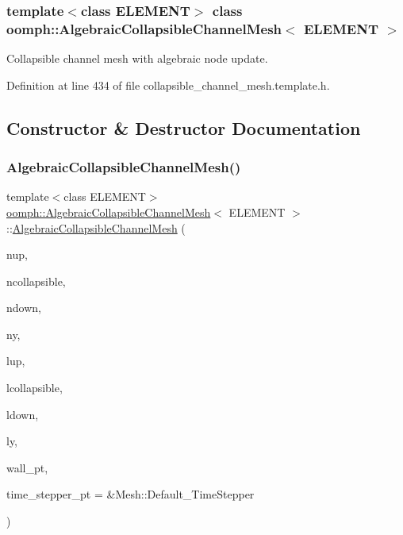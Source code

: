 \subsubsection*{template$<$class E\+L\+E\+M\+E\+NT$>$\newline
class oomph\+::\+Algebraic\+Collapsible\+Channel\+Mesh$<$ E\+L\+E\+M\+E\+N\+T $>$}

Collapsible channel mesh with algebraic node update. 

Definition at line 434 of file collapsible\+\_\+channel\+\_\+mesh.\+template.\+h.



\subsection{Constructor \& Destructor Documentation}
\mbox{\label{classoomph_1_1AlgebraicCollapsibleChannelMesh_ac2e77539dfed482cc3d8b7c9e17a9567}} 
\subsubsection{\texorpdfstring{Algebraic\+Collapsible\+Channel\+Mesh()}{AlgebraicCollapsibleChannelMesh()}\hspace{0.1cm}{\footnotesize\ttfamily [1/2]}}
{\footnotesize\ttfamily template$<$class E\+L\+E\+M\+E\+NT$>$ \\
\hyperlink{classoomph_1_1AlgebraicCollapsibleChannelMesh}{oomph\+::\+Algebraic\+Collapsible\+Channel\+Mesh}$<$ E\+L\+E\+M\+E\+NT $>$\+::\hyperlink{classoomph_1_1AlgebraicCollapsibleChannelMesh}{Algebraic\+Collapsible\+Channel\+Mesh} (\begin{DoxyParamCaption}\item[{const unsigned \&}]{nup,  }\item[{const unsigned \&}]{ncollapsible,  }\item[{const unsigned \&}]{ndown,  }\item[{const unsigned \&}]{ny,  }\item[{const double \&}]{lup,  }\item[{const double \&}]{lcollapsible,  }\item[{const double \&}]{ldown,  }\item[{const double \&}]{ly,  }\item[{Geom\+Object $\ast$}]{wall\+\_\+pt,  }\item[{Time\+Stepper $\ast$}]{time\+\_\+stepper\+\_\+pt = {\ttfamily \&Mesh\+:\+:Default\+\_\+TimeStepper} }\end{DoxyParamCaption})\hspace{0.3cm}{\ttfamily [inline]}}



